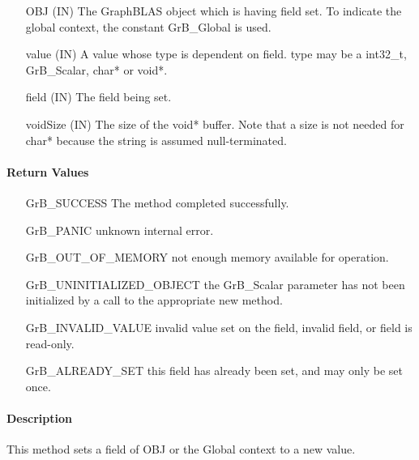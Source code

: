 \begin{itemize}[leftmargin=2.1in]
    \item[{\sf OBJ}] ({\sf IN}) The GraphBLAS object which is having {\sf field} set.
                                To indicate the global context, the constant {\sf GrB\_Global} is used.
    \item[{\sf value}] ({\sf IN}) A value whose type is dependent on {\sf field}.
                                {\sf type} may be a {\sf int32\_t}, {\sf GrB\_Scalar}, {\sf char*} or {\sf void*}.
    \item[{\sf field}] ({\sf IN}) The field being set.
    \item[{\sf voidSize}] ({\sf IN}) The size of the {\sf void*} buffer. Note that a size is not needed for
                                {\sf char*} because the string is assumed null-terminated.
\end{itemize}

\paragraph{Return Values}

\begin{itemize}[leftmargin=2.1in]
    \item[{\sf GrB\_SUCCESS}]  The method completed successfully.
    \item[{\sf GrB\_PANIC}]             unknown internal error.
    \item[{\sf GrB\_OUT\_OF\_MEMORY}]          not enough memory available for operation.
    \item[{\sf GrB\_UNINITIALIZED\_OBJECT}]          the {\sf GrB\_Scalar} parameter has not been
                                        initialized by a call to the appropriate {\sf new} method.
    \item[{\sf GrB\_INVALID\_VALUE}]    invalid value set on the field, invalid field, or field is read-only.
    \item[{\sf GrB\_ALREADY\_SET}]  this field has already been set, and may only be set once. 
    \end{itemize}

\paragraph{Description}

This method sets a field of {\sf OBJ} or the Global context to a new value.